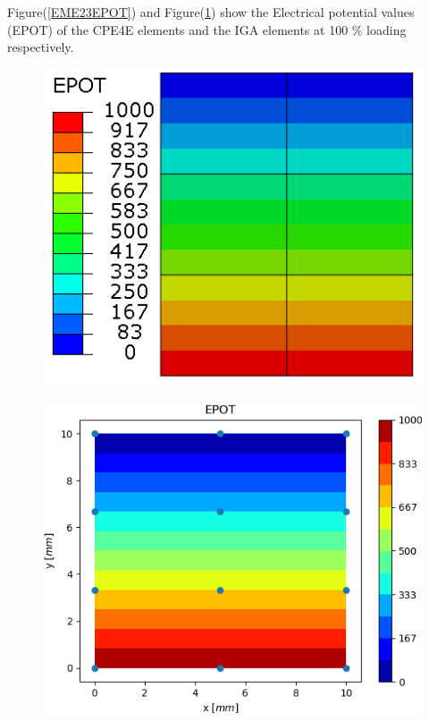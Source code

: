 \documentclass[11pt]{article}
\begin{document}
Figure(\ref{EME23EPOT}) and Figure(\ref{EME23EPOT_IGA}) show the Electrical potential values (EPOT) of the CPE4E elements and the IGA elements at 100 \% loading respectively. \\
\begin{figure}[H]
	\centering
	\begin{minipage}{.5\textwidth}
		\centering
		\includegraphics[width=1\linewidth]{EME23EPOT.png}
		\label{EME23EPOT}
	\end{minipage}%
	\begin{minipage}{.5\textwidth}
		\centering
		\includegraphics[width=1\linewidth]{EME23EPOT_IGA.png}
		\label{EME23EPOT_IGA}
	\end{minipage}
\end{figure}
\end{document}

